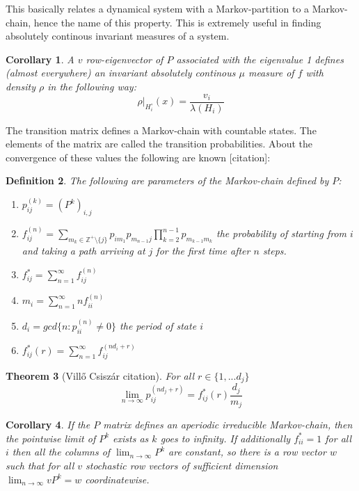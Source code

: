 \documentclass{article}
\newtheorem{theorem}{Theorem}[section]
\newtheorem{cor}[theorem]{Corollary}
\newtheorem{defin}[theorem]{Definition}
\begin{document}
This basically relates a dynamical system with a Markov-partition to a Markov-chain, hence the name of this property. This is extremely useful in finding absolutely continous invariant measures of a system.

\begin{cor}
A $v$ row-eigenvector of $P$ associated with the eigenvalue 1 defines (almost everywhere) an invariant absolutely continous $\mu$ measure of $f$ with density $\rho$ in the following way:\[
\rho|_{H_i^\circ}(x) = \frac{v_i}{\lambda(H_i)}
\]
\end{cor}

The transition matrix defines a Markov-chain with countable states. The elements of the matrix are called the transition probabilities. About the convergence of these values the following are known [citation]:

\begin{defin}
The following are parameters of the Markov-chain defined by $P$:
\begin{enumerate}
\item $p_{ij}^{(k)}=(P^k)_{i,j}$
\item $f_{ij}^{(n)} = \sum_{m_k \in \mathbb{Z}^+ \setminus \{ j \}} p_{im_1}p_{m_{n-1}j}\prod_{k=2}^{n-1}p_{m_{k-1}m_k}$ the probability of starting from $i$ and taking a path arriving at $j$ for the first time after $n$ steps.
\item $f_{ij}^* = \sum_{n=1}^{\infty} f_{ij}^{(n)}$
\item $m_i = \sum_{n=1}^{\infty} nf_{ii}^{(n)}$
\item $d_i = gcd\{n: p_{ii}^{(n)}\neq 0\}$ the period of state $i$
\item $f_{ij}^*(r) = \sum_{n=1}^{\infty} f_{ij}^{(nd_i+r)}$
\end{enumerate}
\end{defin}

\begin{theorem}[Villő Csiszár citation] \label{Villo}
For all $r \in \{1,...d_j\}$ \[ \lim_{n\rightarrow \infty} p_{ij}^{(nd_j+r)}=f_{ij}^*(r) \frac{d_j}{m_j}
\]
\end{theorem} 

\begin{cor} \label{Hatar}
If the $P$ matrix defines an aperiodic irreducible Markov-chain, then the pointwise limit of $P^{k}$ exists as $k$ goes to infinity. If additionally $f^*_{ii} = 1$ for all $i$ then all the columns of $\lim_{n\rightarrow \infty} P^k$ are constant, so there is a row vector $w$ such that for all $v$ stochastic row vectors of sufficient dimension $\lim_{n\rightarrow \infty} vP^k = w$ coordinatewise. 
\end{cor}
\end{document}
